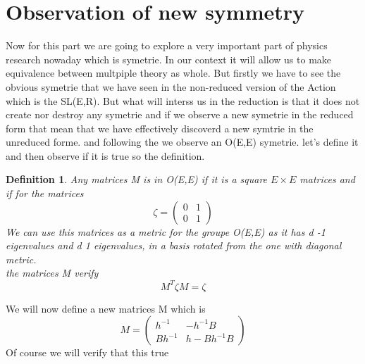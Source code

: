 \documentclass{article}
\newtheorem{definition}{Definition}
\begin{document}
\section{Observation of new symmetry}
Now for this part we are going to explore a very important part of physics research nowaday which is symetrie. In our context it will allow us to make equivalence between multpiple theory as whole. 
But firstly we have to see the obvious symetrie that we have seen in the non-reduced version of the Action which is the SL(E,R).
But what will interss us in the reduction is that it does not create nor destroy any symetrie and if we observe a new symetrie in the reduced form that mean that we have effectively discoverd a new symtrie in the unreduced forme.
and following the \cite{maharana1993noncompact} we observe an O(E,E) symetrie. let's define it and then observe if it is true so the definition.\\
\begin{definition}
    Any matrices M is in O(E,E) if it is a square $E\times E$ matrices and if for the matrices
    \begin{equation*}
        \zeta = \begin{pmatrix}
            0 & 1 \\ 0 &1
        \end{pmatrix}
    \end{equation*}
    We can use this matrices as a metric for the groupe O(E,E) as it has d -1 eigenvalues and d 1 eigenvalues, in  a basis rotated from the one  with diagonal metric.\\ 
    the matrices M verify
    \begin{equation*}
        \boxed{M^T \zeta M = \zeta }
    \end{equation*}
\end{definition}
We will now define a new matrices M which is 
\begin{equation}
    M = \begin{pmatrix}
        h^{-1} & -h^{-1}B \\Bh^{-1} & h-Bh^{-1}B
    \end{pmatrix}
\end{equation}
Of course we will verify that this true
\end{document}
